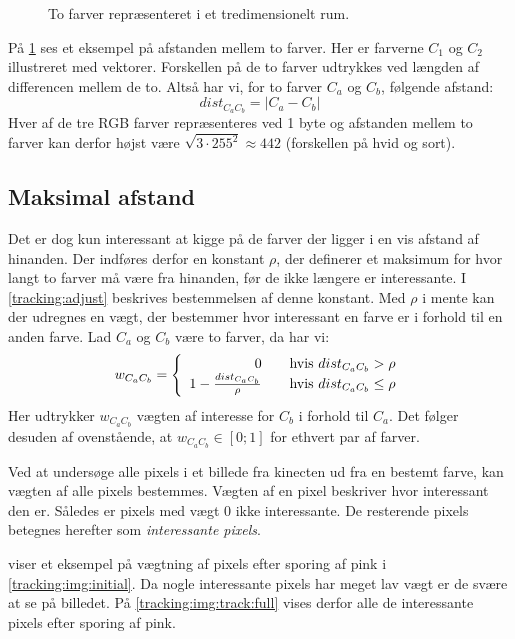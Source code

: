 \begin{figure}
\centering

\caption{To farver repræsenteret i et tredimensionelt rum.}
\label{tracking:colorspace}
\end{figure}

På \cref{tracking:colorspace} ses et eksempel på afstanden mellem to farver.
Her er farverne $C_1$ og $C_2$ illustreret med vektorer.
Forskellen på de to farver udtrykkes ved længden af differencen mellem de to.
Altså har vi, for to farver $C_a$ og $C_b$, følgende afstand:
\begin{equation}
dist_{C_aC_b} = |C_a - C_b|
\end{equation}
Hver af de tre RGB farver repræsenteres ved 1 byte og afstanden mellem to farver kan derfor højst være $\sqrt{3 \cdot 255^2} \approx 442$ (forskellen på hvid og sort).

\subsection{Maksimal afstand}\label{tracking:maksimal_afstand}
Det er dog kun interessant at kigge på de farver der ligger i en vis afstand af hinanden.
Der indføres derfor en konstant $\rho$, der definerer et maksimum for hvor langt to farver må være fra hinanden, før de ikke længere er interessante.
I \cref{tracking:adjust} beskrives bestemmelsen af denne konstant.
Med $\rho$ i mente kan der udregnes en vægt, der bestemmer hvor interessant en farve er i forhold til en anden farve.
Lad $C_a$ og $C_b$ være to farver, da har vi:
\begin{equation}
w_{C_aC_b} = \left\{ 
  \begin{array}{r l}
        0 & \quad \text{hvis $dist_{C_aC_b} > \rho$} \\
       1 - \frac{dist_{C_aC_b}}{\rho} & \quad \text{hvis $dist_{C_aC_b} \leq \rho$}
  \end{array} \right.
\end{equation}
Her udtrykker $w_{C_aC_b}$ vægten af interesse for $C_b$ i forhold til $C_a$.
Det følger desuden af ovenstående, at $w_{C_aC_b} \in [0;1]$ for ethvert par af farver.

Ved at undersøge alle pixels i et billede fra kinecten ud fra en bestemt farve, kan vægten af alle pixels bestemmes.
Vægten af en pixel beskriver hvor interessant den er.
Således er pixels med vægt 0 ikke interessante.
De resterende pixels betegnes herefter som \emph{interessante pixels}.

 viser et eksempel på vægtning af pixels efter sporing af pink i \cref{tracking:img:initial}.
Da nogle interessante pixels har meget lav vægt er de svære at se på billedet.
På \cref{tracking:img:track:full} vises derfor alle de interessante pixels efter sporing af pink.

